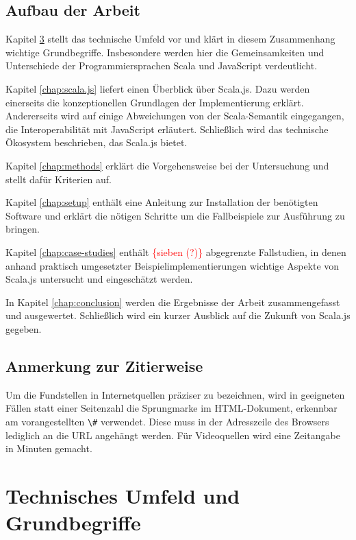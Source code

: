 \documentclass[a4paper, 12pt, hidelinks, listof=totoc, listoftables=totoc, bibliography=totoc]{scrreprt}
\newcommand{\code}[1]{\lstinline[language=Scala, style=inline]|#1|}
\newcommand{\TODOi}[1]{\textcolor{red}{\{#1\}}}
\begin{document}
\section{Aufbau der Arbeit}

Kapitel \ref{chap:basics} stellt das technische Umfeld vor und klärt in diesem Zusammenhang wichtige Grundbegriffe. Insbesondere werden hier die Gemeinsamkeiten und Unterschiede der Programmiersprachen Scala und JavaScript verdeutlicht.

Kapitel \ref{chap:scala.js} liefert einen Überblick über Scala.js. Dazu werden einerseits die konzeptionellen Grundlagen der Implementierung erklärt. Andererseits wird auf einige Abweichungen von der Scala-Semantik eingegangen, die Interoperabilität mit JavaScript erläutert. Schließlich wird das technische Ökosystem beschrieben, das Scala.js bietet.

Kapitel \ref{chap:methods} erklärt die Vorgehensweise bei der Untersuchung und stellt dafür Kriterien auf.

Kapitel \ref{chap:setup} enthält eine Anleitung zur Installation der benötigten Software und erklärt die nötigen Schritte um die Fallbeispiele zur Ausführung zu bringen.

Kapitel \ref{chap:case-studies} enthält \TODOi{sieben (?)} abgegrenzte Fallstudien, in denen anhand praktisch umgesetzter Beispielimplementierungen wichtige Aspekte von Scala.js untersucht und eingeschätzt werden.

In Kapitel \ref{chap:conclusion} werden die Ergebnisse der Arbeit zusammengefasst und ausgewertet. Schließlich wird ein kurzer Ausblick auf die Zukunft von Scala.js gegeben.


\section{Anmerkung zur Zitierweise}

Um die Fundstellen in Internetquellen präziser zu bezeichnen, wird in geeigneten Fällen statt einer Seitenzahl die Sprungmarke im \ac{HTML}-Dokument, erkennbar am vorangestellten \code{\#} verwendet. Diese muss in der Adresszeile des Browsers lediglich an die URL angehängt werden. Für Videoquellen wird eine Zeitangabe in Minuten gemacht.


\chapter{Technisches Umfeld und Grundbegriffe}\label{chap:basics}
\end{document}
